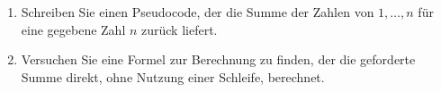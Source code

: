 \begin{enumerate}
	\item Schreiben Sie einen Pseudocode, der die Summe der Zahlen von $1, \dots, n$ für eine gegebene Zahl $n$ zurück liefert. 
	\item Versuchen Sie eine Formel zur Berechnung zu finden, der die geforderte Summe direkt, ohne Nutzung einer Schleife, berechnet.
\end{enumerate}